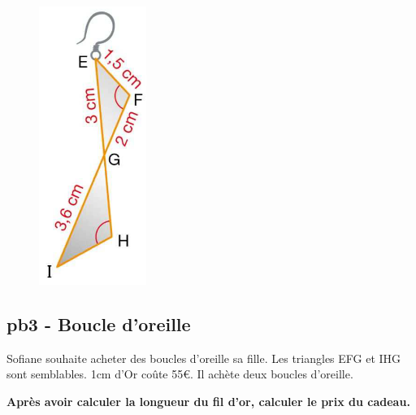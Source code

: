 \horrule{1px}

\begin{minipage}[t]{0.2\textwidth}
  \begin{figure}[H]
    \includegraphics[width=0.6\linewidth]{4x3-triangles-semblables/ie-pb3.png}
  \end{figure}
\end{minipage}
\begin{minipage}[t]{0.75\textwidth}
  \subsection*{pb3 - Boucle d'oreille}

  Sofiane souhaite acheter des boucles d'oreille sa fille. Les triangles EFG et IHG sont semblables. 1cm d'Or coûte 55€. Il achète deux boucles d'oreille.  

\textbf{Après avoir calculer la longueur du fil d'or, calculer le prix du cadeau. }
\end{minipage}

